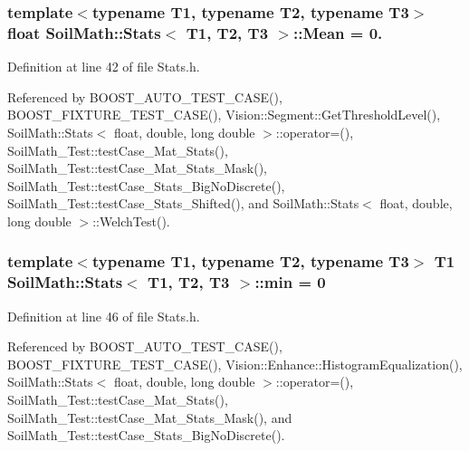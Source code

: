 \subsubsection[{Mean}]{\setlength{\rightskip}{0pt plus 5cm}template$<$typename T1, typename T2, typename T3$>$ float {\bf Soil\+Math\+::\+Stats}$<$ T1, T2, T3 $>$\+::Mean = 0.}\label{class_soil_math_1_1_stats_a6f53982d52cf492ddd4df9b56bd014e7}


Definition at line 42 of file Stats.\+h.



Referenced by B\+O\+O\+S\+T\+\_\+\+A\+U\+T\+O\+\_\+\+T\+E\+S\+T\+\_\+\+C\+A\+S\+E(), B\+O\+O\+S\+T\+\_\+\+F\+I\+X\+T\+U\+R\+E\+\_\+\+T\+E\+S\+T\+\_\+\+C\+A\+S\+E(), Vision\+::\+Segment\+::\+Get\+Threshold\+Level(), Soil\+Math\+::\+Stats$<$ float, double, long double $>$\+::operator=(), Soil\+Math\+\_\+\+Test\+::test\+Case\+\_\+\+Mat\+\_\+\+Stats(), Soil\+Math\+\_\+\+Test\+::test\+Case\+\_\+\+Mat\+\_\+\+Stats\+\_\+\+Mask(), Soil\+Math\+\_\+\+Test\+::test\+Case\+\_\+\+Stats\+\_\+\+Big\+No\+Discrete(), Soil\+Math\+\_\+\+Test\+::test\+Case\+\_\+\+Stats\+\_\+\+Shifted(), and Soil\+Math\+::\+Stats$<$ float, double, long double $>$\+::\+Welch\+Test().

\hypertarget{class_soil_math_1_1_stats_aa44c07a23b1c2ce0f0407e7cee4f39a9}{}
\subsubsection[{min}]{\setlength{\rightskip}{0pt plus 5cm}template$<$typename T1, typename T2, typename T3$>$ T1 {\bf Soil\+Math\+::\+Stats}$<$ T1, T2, T3 $>$\+::min = 0}\label{class_soil_math_1_1_stats_aa44c07a23b1c2ce0f0407e7cee4f39a9}


Definition at line 46 of file Stats.\+h.



Referenced by B\+O\+O\+S\+T\+\_\+\+A\+U\+T\+O\+\_\+\+T\+E\+S\+T\+\_\+\+C\+A\+S\+E(), B\+O\+O\+S\+T\+\_\+\+F\+I\+X\+T\+U\+R\+E\+\_\+\+T\+E\+S\+T\+\_\+\+C\+A\+S\+E(), Vision\+::\+Enhance\+::\+Histogram\+Equalization(), Soil\+Math\+::\+Stats$<$ float, double, long double $>$\+::operator=(), Soil\+Math\+\_\+\+Test\+::test\+Case\+\_\+\+Mat\+\_\+\+Stats(), Soil\+Math\+\_\+\+Test\+::test\+Case\+\_\+\+Mat\+\_\+\+Stats\+\_\+\+Mask(), and Soil\+Math\+\_\+\+Test\+::test\+Case\+\_\+\+Stats\+\_\+\+Big\+No\+Discrete().

\hypertarget{class_soil_math_1_1_stats_a7bc57af334b68253832ebac17f85d091}{}
